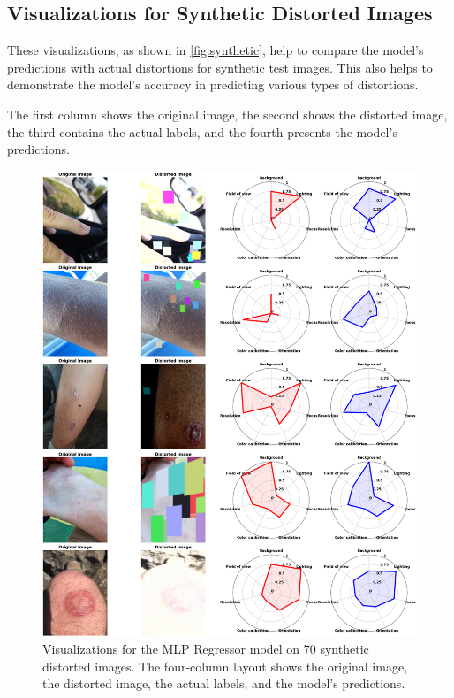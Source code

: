 \subsection{Visualizations for Synthetic Distorted Images}
\label{subsec:SyntheticDistortedImages}
These visualizations, as shown in \autoref{fig:synthetic}, help to compare the model’s predictions with actual distortions for synthetic test images. This also helps to demonstrate the model’s accuracy in predicting various types of distortions. \par
\vspace{\baselineskip}
\noindent
The first column shows the original image, the second shows the distorted image, the third contains the actual labels, and the fourth presents the model’s predictions. \par
\begin{figure}[ht]
    \centering
    \includegraphics[keepaspectratio,width=15cm]{img/synthetic.png}
    \caption{Visualizations for the MLP Regressor model on 70 synthetic distorted images. The four-column layout shows the original image, the distorted image, the actual labels, and the model's predictions.}
    \label{fig:synthetic}
\end{figure}

